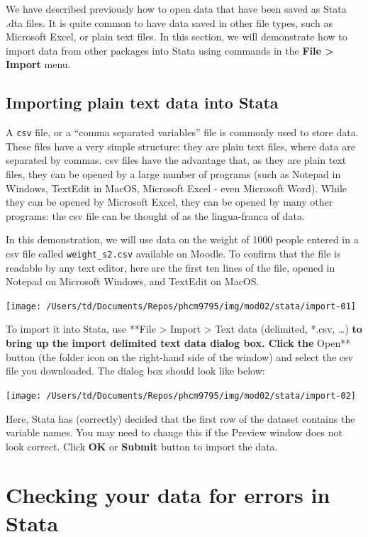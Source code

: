 \documentclass[
]{memoir}
\begin{document}
We have described previously how to open data that have been saved as Stata .dta files. It is quite common to have data saved in other file types, such as Microsoft Excel, or plain text files. In this section, we will demonstrate how to import data from other packages into Stata using commands in the \textbf{File \textgreater{} Import} menu.

\hypertarget{importing-plain-text-data-into-stata}{%
\subsection{Importing plain text data into Stata}\label{importing-plain-text-data-into-stata}}

A \texttt{csv} file, or a ``comma separated variables'' file is commonly used to store data. These files have a very simple structure: they are plain text files, where data are separated by commas. csv files have the advantage that, as they are plain text files, they can be opened by a large number of programs (such as Notepad in Windows, TextEdit in MacOS, Microsoft Excel - even Microsoft Word). While they can be opened by Microsoft Excel, they can be opened by many other programs: the csv file can be thought of as the lingua-franca of data.

In this demonstration, we will use data on the weight of 1000 people entered in a csv file called \texttt{weight\_s2.csv} available on Moodle.
To confirm that the file is readable by any text editor, here are the first ten lines of the file, opened in Notepad on Microsoft Windows, and TextEdit on MacOS.

\texttt{[image: /Users/td/Documents/Repos/phcm9795/img/mod02/stata/import-01]}

To import it into Stata, use **File \textgreater{} Import \textgreater{} Text data (delimited, *.csv, \ldots)\textbf{ to bring up the import delimited text data dialog box. Click the }Open** button (the folder icon on the right-hand side of the window) and select the csv file you downloaded. The dialog box should look like below:

\texttt{[image: /Users/td/Documents/Repos/phcm9795/img/mod02/stata/import-02]}

Here, Stata has (correctly) decided that the first row of the dataset contains the variable names. You may need to change this if the Preview window does not look correct. Click \textbf{OK} or \textbf{Submit} button to import the data.

\hypertarget{checking-your-data-for-errors-in-stata}{%
\section{Checking your data for errors in Stata}\label{checking-your-data-for-errors-in-stata}}
\end{document}
